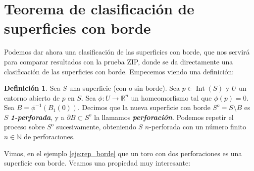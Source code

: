 \documentclass[10pt]{report}
\newcommand{\R}{\mathbb{R}}
\newcommand{\N}{\mathbb{N}}
\DeclareMathOperator{\interior}{Int} %
\newcommand{\enfatiza}[1]{\textbf{\textit{#1}}}
\theoremstyle{definition}
\newtheorem{defin}{Definición}[section]
\begin{document}
\section{Teorema de clasificación de superficies con borde}
Podemos dar ahora una clasificación de las superficies con borde, que nos servirá para comparar resultados con la prueba ZIP, donde se da directamente una clasificación de las superficies con borde.
Empecemos viendo una definición:
\begin{defin}%
\label{def:perforacion}
Sea $S$ una superficie (con o sin borde). Sea $p\in \interior (S)$ y $U$ un entorno abierto de $p$ en $S$. Sea $\phi :U\to \R^n$ un homeomorfismo tal que $\phi (p)=0$. Sea $B=\phi ^{-1}(B_1(0))$. Decimos que la nueva superficie con borde $S^o=S\setminus B$ es $S$ \enfatiza{1-perforada}, y a $\partial B\subset S^o$ la llamamos \enfatiza{perforación}. Podemos repetir el proceso sobre $S^o$ sucesivamente, obteniendo $S$ $n$-perforada con un número finito $n\in \N$ de perforaciones.
\end{defin}

Vimos, en el ejemplo \autoref{eje:rep_borde} que un toro con dos perforaciones es una superficie con borde. Veamos una propiedad muy interesante:
\end{document}
